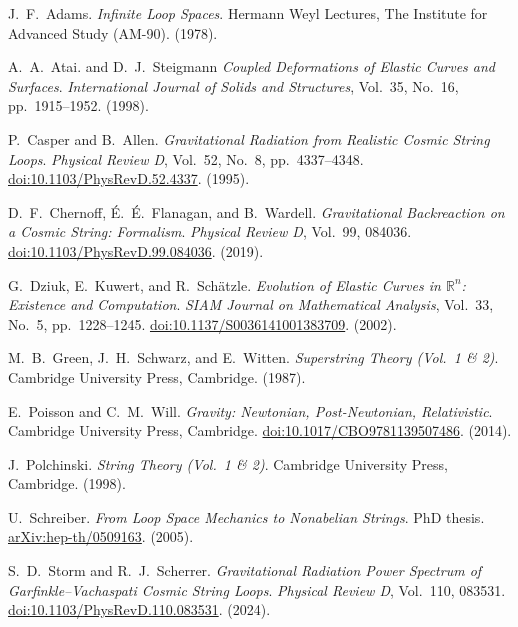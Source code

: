 \documentclass{article}
\numberwithin{tm}{section}
\numberwithin{dn}{section}
\numberwithin{as}{section}
\numberwithin{rk}{section}
\numberwithin{lem}{section}
\numberwithin{ax}{section}
\numberwithin{pp}{section}
\numberwithin{eg}{section}
\numberwithin{war}{section}
\numberwithin{equation}{section}
\numberwithin{prop}{section}
\numberwithin{nt}{section}
\numberwithin{rc}{section}
\begin{document}
\begin{thebibliography}{9}
J.~F.~Adams. \emph{Infinite Loop Spaces}. Hermann Weyl Lectures, The Institute for Advanced Study (AM-90). (1978).

A.~A.~Atai. and D.~J.~Steigmann \emph{Coupled Deformations of Elastic Curves and Surfaces}. \emph{International Journal of Solids and Structures}, Vol.~35, No.~16, pp.~1915--1952. (1998).

P.~Casper and B.~Allen.
\emph{Gravitational Radiation from Realistic Cosmic String Loops}.
\emph{Physical Review D}, Vol.~52, No.~8, pp.~4337--4348.
\href{https://doi.org/10.1103/PhysRevD.52.4337}
{doi:10.1103/PhysRevD.52.4337}. (1995).

D.~F.~Chernoff, \'{E}.~\'{E}.~Flanagan, and B.~Wardell. \emph{Gravitational Backreaction on a Cosmic String: Formalism}. \emph{Physical Review D}, Vol.~99, 084036. \href{https://doi.org/10.1103/PhysRevD.99.084036}{doi:10.1103/PhysRevD.99.084036}. (2019).

G.~Dziuk, E.~Kuwert, and R.~Sch\"atzle.
\emph{Evolution of Elastic Curves in $\mathbb{R}^n$: Existence and Computation}.
\emph{SIAM Journal on Mathematical Analysis}, Vol.~33, No.~5, pp.~1228--1245.
\href{https://doi.org/10.1137/S0036141001383709}{doi:10.1137/S0036141001383709}.
(2002).

M.~B.~Green, J.~H.~Schwarz, and E.~Witten. \emph{Superstring Theory (Vol.~1 \& 2)}. Cambridge University Press, Cambridge. (1987).

E.~Poisson and C.~M.~Will. \emph{Gravity: Newtonian, Post-Newtonian, Relativistic}. Cambridge University Press, Cambridge. \href{https://doi.org/10.1017/CBO9781139507486}{doi:10.1017/CBO9781139507486}. (2014).

J.~Polchinski. \emph{String Theory (Vol.~1 \& 2)}. Cambridge University Press, Cambridge. (1998).

U.~Schreiber. \emph{From Loop Space Mechanics to Nonabelian Strings}. PhD thesis. \href{https://arxiv.org/abs/hep-th/0509163}{arXiv:hep-th/0509163}. (2005).

S.~D.~Storm and R.~J.~Scherrer.
\emph{Gravitational Radiation Power Spectrum of Garfinkle--Vachaspati Cosmic String Loops}.
\emph{Physical Review D}, Vol.~110, 083531.
\href{https://doi.org/10.1103/PhysRevD.110.083531}
{doi:10.1103/PhysRevD.110.083531}. (2024).


\end{thebibliography}
\end{document}
